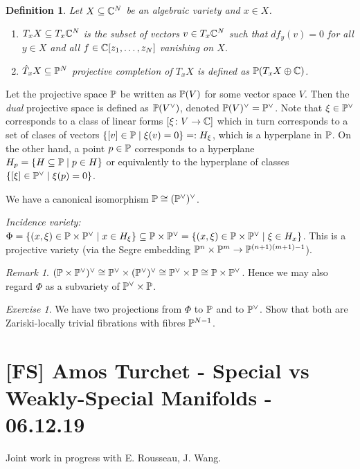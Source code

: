 \documentclass[A4paper, british]{amsart}
\theoremstyle{darkgreentheorem}
\theoremstyle{darkbluedefinition}
\newtheorem{defn}[thm]{Definition}
\theoremstyle{darkredexample}
\theoremstyle{remark}
\newtheorem{rem}[thm]{Remark}
\newtheorem{exe}[thm]{Exercise}
\newcommand{\1}{\mathbbm{1}}
\newcommand{\op}{\oplus}
\newcommand{\dual}{^{\vee}}
\newcommand{\tms}{\times}
\newcommand{\sub}{\subseteq}
\begin{document}
\begin{defn}
    Let $X\sub \C^{N}$ be an algebraic variety and $x\in X$.
    \begin{enumerate}
	\item $T_{x}X\sub T_{x}\C^{N}$ is the subset of vectors $v\in T_{x}\C^{N}$ such that $df_{y}(v)=0$ for all $y\in X$ and all $f\in \C[z_{1},\ldots,z_{N}]$ vanishing on $X$.
	\item $\hat{T}_{x}X\sub \P^{N}$ \textit{projective completion} of $T_{x}X$ is defined as $\P(T_{x}X\op \C)$.
    \end{enumerate}
\end{defn}

Let the projective space $\P$ be written as $\P(V)$ for some vector space $V$.
Then the \textit{dual} projective space is defined as $\P(V\dual)$, denoted $\P(V)\dual=\P\dual$.
Note that $\xi\in \P\dual$ corresponds to a class of linear forms $[\xi\colon V\to \C]$ which in turn corresponds to a set of clases of vectors $\{ [v]\in \P\mid \xi(v)=0\}=:H_{\xi}$, which is a hyperplane in $\P$.
On the other hand, a point $p\in \P$ corresponds to a hyperplane $H_{p}=\{ H\sub \P\mid p\in H\}$ or equivalently to the hyperplane of classes $\{[\xi]\in \P\dual \mid \xi(p)=0 \}$.

We have a canonical isomorphism $\P\cong (\P\dual)\dual$.

\textit{Incidence variety:} $\Phi=\{ (x,\xi)\in \P\tms \P\dual \mid x\in H_{\xi}\}\sub \P\tms \P\dual=\{(x,\xi)\in \P\tms \P\dual\mid \xi\in H_{x}\}$.
This is a projective variety (via the Segre embedding $\P^{n}\tms \P^{m}\to \P^{(n+1)(m+1)-1}$).

\begin{rem}
    $(\P\tms \P\dual)\dual\cong \P\dual \tms (\P\dual)\dual\cong \P\dual \tms \P\cong \P\tms \P\dual$.
    Hence we may also regard $\Phi $ as a subvariety of $\P\dual \tms \P$.
\end{rem}

\begin{exe}
    We have two projections from $\Phi$ to $\P$ and to $\P\dual$.
    Show that both are Zariski-locally trivial fibrations with fibres $\P^{N-1}$.
\end{exe}

\section{[FS] Amos Turchet - Special vs Weakly-Special Manifolds - 06.12.19}

Joint work in progress with E. Rousseau, J. Wang.
\end{document}
